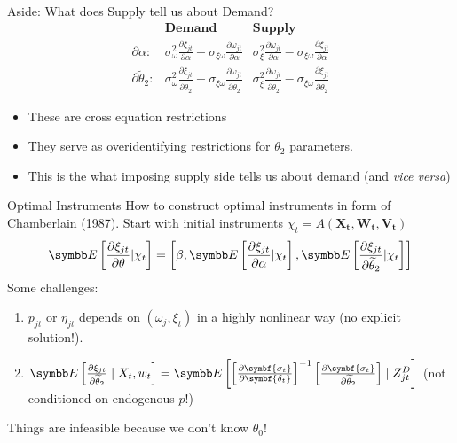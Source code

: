 \documentclass[aspectratio=169,10pt]{beamer}
\begin{document}
\begin{frame}{Aside: What does Supply tell us about Demand?}
\begin{align*}
& \textbf{Demand} & \textbf{Supply} \\
\partial \alpha:&
        \sigma_\omega^2 \frac{\partial \xi_{jt}}{\partial \alpha} -
        \sigma_{\xi\omega}\frac{\partial \omega_{jt}}{\partial \alpha}
        & \sigma_{\xi}^2 \frac{\partial \omega_{jt}}{\partial \alpha}  -
        \sigma_{\xi\omega}\frac{\partial \xi_{jt}}{\partial \alpha}  \\
\partial \widetilde{\theta}_2:&
        \sigma_\omega^2 \frac{\partial \xi_{jt}}{\partial \widetilde{\theta}_2}  -
        \sigma_{\xi\omega}\frac{\partial \omega_{jt}}{\partial \widetilde{\theta}_2}
        & \sigma_{\xi}^2 \frac{\partial \omega_{jt}}{\partial \widetilde{\theta}_2} -
        \sigma_{\xi\omega}\frac{\partial \xi_{jt}}{\partial \widetilde{\theta}_2}
\end{align*}
\begin{itemize}
\item These are \alert{cross equation restrictions}
\item They serve as \alert{overidentifying restrictions} for $\theta_2$ parameters.
\item This is the what imposing supply side tells us about demand (and \textit{vice versa})
\end{itemize}
\end{frame}


\begin{frame}{Optimal Instruments}
How to construct optimal instruments in form of Chamberlain (1987). Start with initial instruments $\chi_t = A\left(\symbf{X_t},\symbf{W_t},\symbf{V_t}\right)$
\begin{eqnarray*}
\E\left[\frac{\partial \xi_{jt}}{\partial \theta} | \chi_{t} \right] = \left[\beta, \E\left[\frac{\partial \xi_{jt}}{\partial \alpha} | \chi_{t} \right] ,
 \E\left[\frac{\partial \xi_{jt}}{\partial \widetilde{\theta}_2} | \chi_{t} \right] \right]
\end{eqnarray*}
Some challenges:
\begin{enumerate}
\item $p_{jt}$ or $\eta_{jt}$ depends on $(\omega_{j},\xi_{t})$ in a highly nonlinear way (no explicit solution!).
\item $\E\left[\frac{\partial \xi_{jt}}{\partial \widetilde{\theta}_2} \mid X_t, w_{t} \right] =\E\left[\left[\frac{\partial \symbf{\sigma_t}}{\partial \symbf{\delta_t}}\right]^{-1} 
\left[\frac{\partial \symbf{\sigma_t}}{\partial \widetilde{\theta}_2}\right] \mid Z_{jt}^D \right]$  (not conditioned on endogenous $p$!)
\end{enumerate}
Things are \alert{infeasible} because we don't know $\theta_0$!
\end{frame}
\end{document}
